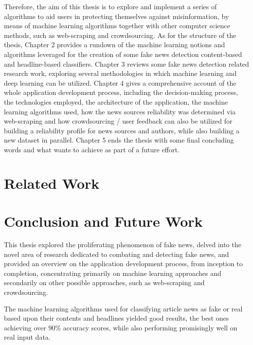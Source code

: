 \documentclass[12pt, a4paper]{article}
\begin{document}
    Therefore, the aim of this thesis is to explore and implement a series of algorithms to aid users in protecting themselves against misinformation, by means of machine learning algorithms together with other computer science methods, such as web-scraping and crowdsourcing. As for the structure of the thesis, Chapter 2 provides a rundown of the machine learning notions and algorithms leveraged for the creation of some fake news detection content-based and headline-based classifiers. Chapter 3 reviews some fake news detection related research work, exploring several methodologies in which machine learning and deep learning can be utilized. Chapter 4 gives a comprehensive account of the whole application development process, including the decision-making process, the technologies employed, the architecture of the application, the machine learning algorithms used, how the news sources reliability was determined via web-scraping and how crowdsourcing / user feedback can also be utilized for building a reliability profile for news sources and authors, while also building a new dataset in parallel. Chapter 5 ends the thesis with some final concluding words and what wants to achieve as part of a future effort.
  \newpage

  

  \section{Related Work}
    
  \newpage

  

  \newpage
  \section{Conclusion and Future Work}
  This thesis explored the proliferating phenomenon of fake news, delved into the novel area of research dedicated to combating and detecting fake news, and provided an overview on the application development process, from inception to completion, concentrating primarily on machine learning approaches and secondarily on other possible approaches, such as web-scraping and crowdsourcing. 
  
  The machine learning algorithms used for classifying article news as fake or real based upon their contents and headlines yielded good results, the best ones achieving over 90\% accuracy scores, while also performing promisingly well on real input data.
  
\end{document}
